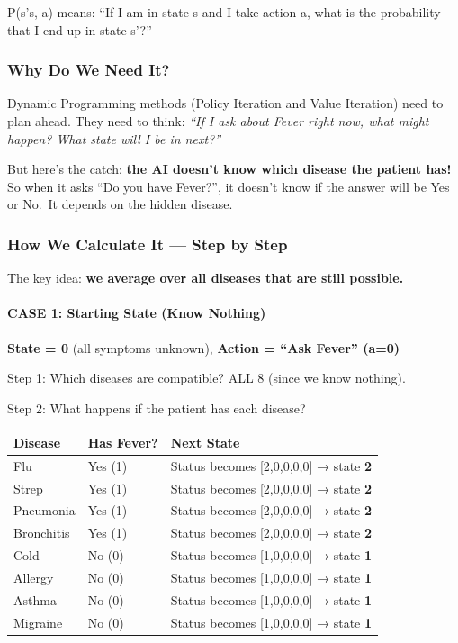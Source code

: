 \documentclass[
]{article}
\begin{document}
P(s'\textbar s, a) means: ``If I am in state s and I take action a, what
is the probability that I end up in state s'?''

\hypertarget{why-do-we-need-it}{%
\subsubsection{Why Do We Need It?}\label{why-do-we-need-it}}

Dynamic Programming methods (Policy Iteration and Value Iteration) need
to plan ahead. They need to think: \emph{``If I ask about Fever right
now, what might happen? What state will I be in next?''}

But here's the catch: \textbf{the AI doesn't know which disease the
patient has!} So when it asks ``Do you have Fever?'', it doesn't know if
the answer will be Yes or No.~It depends on the hidden disease.

\hypertarget{how-we-calculate-it-step-by-step}{%
\subsubsection{How We Calculate It --- Step by
Step}\label{how-we-calculate-it-step-by-step}}

The key idea: \textbf{we average over all diseases that are still
possible.}

\hypertarget{case-1-starting-state-know-nothing}{%
\paragraph{CASE 1: Starting State (Know
Nothing)}\label{case-1-starting-state-know-nothing}}

\textbf{State = 0} (all symptoms unknown), \textbf{Action = ``Ask
Fever'' (a=0)}

Step 1: Which diseases are compatible? ALL 8 (since we know nothing).

Step 2: What happens if the patient has each disease?

\begin{longtable}[]{@{}lll@{}}
\toprule
Disease & Has Fever? & Next State \\
\midrule
\endhead
Flu & Yes (1) & Status becomes {[}2,0,0,0,0{]} → state \textbf{2} \\
Strep & Yes (1) & Status becomes {[}2,0,0,0,0{]} → state \textbf{2} \\
Pneumonia & Yes (1) & Status becomes {[}2,0,0,0,0{]} → state
\textbf{2} \\
Bronchitis & Yes (1) & Status becomes {[}2,0,0,0,0{]} → state
\textbf{2} \\
Cold & No (0) & Status becomes {[}1,0,0,0,0{]} → state \textbf{1} \\
Allergy & No (0) & Status becomes {[}1,0,0,0,0{]} → state \textbf{1} \\
Asthma & No (0) & Status becomes {[}1,0,0,0,0{]} → state \textbf{1} \\
Migraine & No (0) & Status becomes {[}1,0,0,0,0{]} → state \textbf{1} \\
\bottomrule
\end{longtable}
\end{document}
